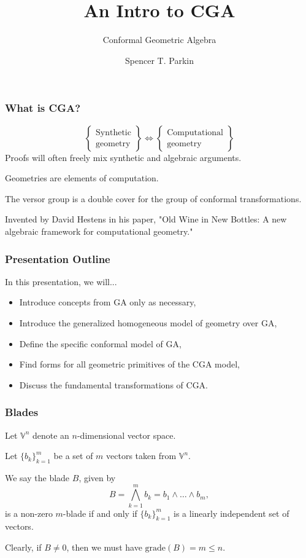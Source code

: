 \documentclass{beamer}
\title{An Intro to CGA}
\subtitle{Conformal Geometric Algebra}
\author{Spencer T. Parkin}
\institute{Avalanche Software}
\newcommand{\V}{\mathbb{V}}
\newcommand{\grade}{\mbox{grade}}
\begin{document}
\frame{\titlepage}

\begin{frame}
\frametitle{What is CGA?}
\begin{equation*}
\left\{\begin{array}{c}
\mbox{Synthetic} \\
\mbox{geometry}
\end{array}\right\}
\Longleftrightarrow
\left\{\begin{array}{c}
\mbox{Computational} \\
\mbox{geometry}
\end{array}\right\}
\end{equation*}\pause
Proofs will often freely mix synthetic and algebraic arguments.\pause

Geometries are elements of computation.\pause

The versor group is a double cover for the group of conformal transformations.\pause

Invented by \alert{David Hestens} in his paper, "Old Wine in New Bottles:
A new algebraic framework for computational geometry."
\end{frame}

\begin{frame}
\frametitle{Presentation Outline}
In this presentation, we will...\pause
\begin{itemize}
\item Introduce concepts from GA only as necessary,\pause
\item Introduce the generalized homogeneous model of geometry over GA,\pause
\item Define the specific conformal model of GA,\pause
\item Find forms for all geometric primitives of the CGA model,\pause
\item Discuss the fundamental transformations of CGA.
\end{itemize}
\end{frame}

\begin{frame}
\frametitle{Blades}
Let $\V^n$ denote an $n$-dimensional vector space.\pause

Let $\{b_k\}_{k=1}^m$ be a set of $m$ vectors taken from $\V^n$.\pause
\begin{definition}
We say the blade $B$, given by
\begin{equation*}
B = \bigwedge_{k=1}^m b_k = b_1\wedge\dots\wedge b_m,
\end{equation*}
is a non-zero $m$-blade if and only if $\{b_k\}_{k=1}^m$
is a linearly independent set of vectors.
\end{definition}\pause
Clearly, if $B\neq 0$, then we must have $\grade(B)=m\leq n$.
\end{frame}
\end{document}
